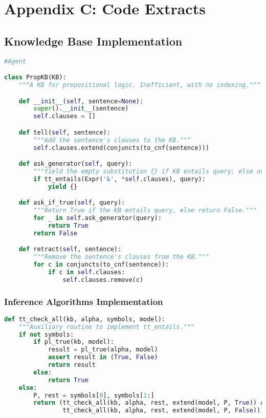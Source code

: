 
\chapter{Appendix C: Code Extracts}
\label{chapter:code}

\section*{Knowledge Base Implementation}

\begin{lstlisting}[language=Python, caption=Knowledge Base Implementation.]
#Agent

class PropKB(KB):
    """A KB for propositional logic. Inefficient, with no indexing."""

    def __init__(self, sentence=None):
        super().__init__(sentence)
        self.clauses = []

    def tell(self, sentence):
        """Add the sentence's clauses to the KB."""
        self.clauses.extend(conjuncts(to_cnf(sentence)))

    def ask_generator(self, query):
        """Yield the empty substitution {} if KB entails query; else no results."""
        if tt_entails(Expr('&', *self.clauses), query):
            yield {}

    def ask_if_true(self, query):
        """Return True if the KB entails query, else return False."""
        for _ in self.ask_generator(query):
            return True
        return False

    def retract(self, sentence):
        """Remove the sentence's clauses from the KB."""
        for c in conjuncts(to_cnf(sentence)):
            if c in self.clauses:
                self.clauses.remove(c)
\end{lstlisting}
\label{listing:KB_implemnt}


\subsection*{Inference Algorithms Implementation}



\begin{lstlisting}[language=Python, caption=Model Checking Algorithm]
def tt_check_all(kb, alpha, symbols, model):
    """Auxiliary routine to implement tt_entails."""
    if not symbols:
        if pl_true(kb, model):
            result = pl_true(alpha, model)
            assert result in (True, False)
            return result
        else:
            return True
    else:
        P, rest = symbols[0], symbols[1:]
        return (tt_check_all(kb, alpha, rest, extend(model, P, True)) and
                tt_check_all(kb, alpha, rest, extend(model, P, False)))
\end{lstlisting}
\label{listing:m_checking}

